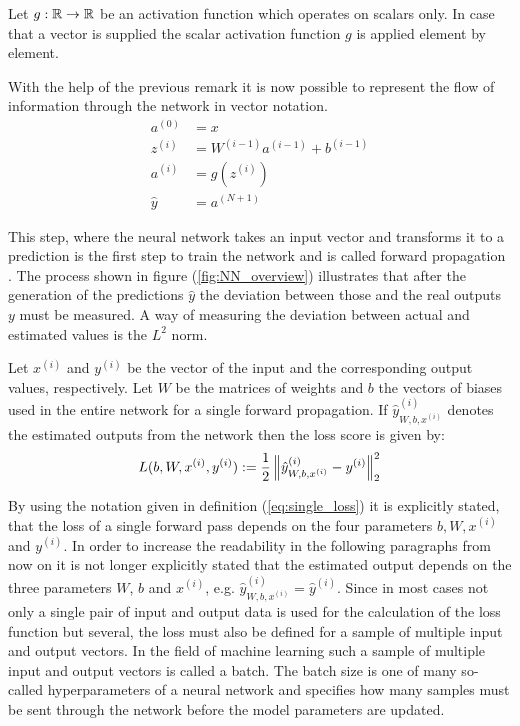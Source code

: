\begin{remark}
	Let $g: \mathbb{R} \rightarrow \mathbb{R}$ be an activation function which operates on scalars only. In case that a vector is supplied the scalar activation function $g$ is applied element by element. 
\end{remark}

With the help of the previous remark it is now possible to represent the flow of information through the network in vector notation.
\begin{equation}
\begin{aligned}
	a^{(0)} 	&= x								\\
	z^{(i)} 	&= W^{(i-1)} a^{(i-1)} + b^{(i-1)} 	\\
	a^{(i)}		&= g(z^{(i)}) 						\\
	\hat{y} 	&= a^{(N+1)}
\end{aligned}
\end{equation}

This step, where the neural network takes an input vector and transforms it to a prediction is the first step to train the network and is called forward propagation \cite{Propagation}. The process shown in figure (\ref{fig:NN_overview}) illustrates that after the generation of the predictions $\hat{y}$ the deviation between those and the real outputs $y$ must be measured. A way of measuring the deviation between actual and estimated values is the $L^2$ norm.

\begin{definition}
	Let $x^{(i)}$ and $y^{(i)}$ be the vector of the input and the corresponding output values, respectively. Let $W$ be the matrices of weights and $b$ the vectors of biases used in the entire network for a single forward propagation. If $\hat{y}_{W,b,x^{(i)}}^{(i)}$ denotes the estimated outputs from the network then the loss score is given by:	
	\begin{equation}\label{eq:single_loss}
		L(b, W, x^{(i)}, y^{(i)}) := \frac{1}{2} \left\lVert\hat{y}_{W,b,x^{(i)}}^{(i)} - y^{(i)}\right\rVert^2_2
	\end{equation}
\end{definition}

By using the notation given in definition (\ref{eq:single_loss}) it is explicitly stated, that the loss of a single forward pass depends on the four parameters $b, W, x^{(i)}$ and $y^{(i)}$. In order to increase the readability in the following paragraphs from now on it is not longer explicitly stated that the estimated output depends on the three parameters $W$, $b$ and $x^{(i)}$, e.g. $\hat{y}_{W,b,x^{(i)}}^{(i)} = \hat{y}^{(i)}$. Since in most cases not only a single pair of input and output data is used for the calculation of the loss function but several, the loss must also be defined for a sample of multiple input and output vectors. In the field of machine learning such a sample of multiple input and output vectors is called a batch. The batch size is one of many so-called hyperparameters of a neural network and specifies how many samples must be sent through the network before the model parameters are updated.

